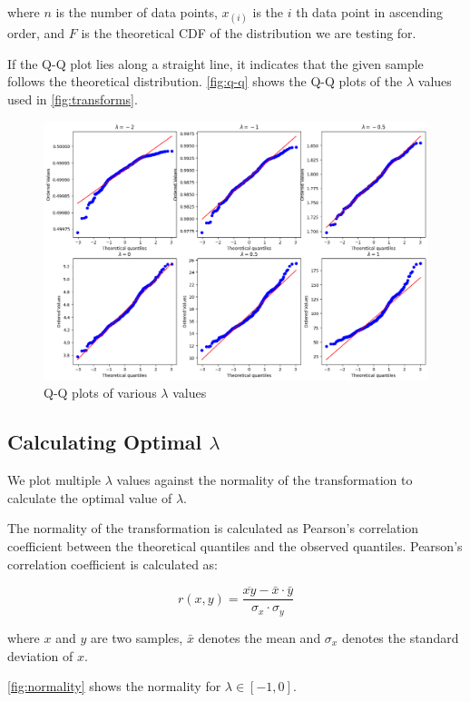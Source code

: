 \noindent where $n$ is the number of data points, $x_{(i)}$ is the $i$ th data point in ascending order, and $F$ is the theoretical CDF of the distribution we are testing for.

If the Q-Q plot lies along a straight line, it indicates that the given sample follows the theoretical distribution.
\autoref{fig:q-q} shows the Q-Q plots of the $\lambda$ values used in \autoref{fig:transforms}.

\begin{figure}[!ht]
  \centering
  \includegraphics[width=\textwidth]{images/q-q.png}
  \caption{Q-Q plots of various $\lambda$ values}
  \label{fig:q-q}
\end{figure}


\subsection{Calculating Optimal $\lambda$}

We plot multiple $\lambda$ values against the normality of the transformation to calculate the optimal value of $\lambda$.

The normality of the transformation is calculated as Pearson's correlation coefficient between the theoretical quantiles and the observed quantiles.
Pearson's correlation coefficient is calculated as:

\[ r(x, y) = \frac{\overline{xy} - \bar{x} \cdot \bar{y}}{\sigma_x \cdot \sigma_y} \]

\noindent where $x$ and $y$ are two samples, $\bar{x}$ denotes the mean and $\sigma_x$ denotes the standard deviation of $x$.

\autoref{fig:normality} shows the normality for $\lambda \in [-1, 0]$.

